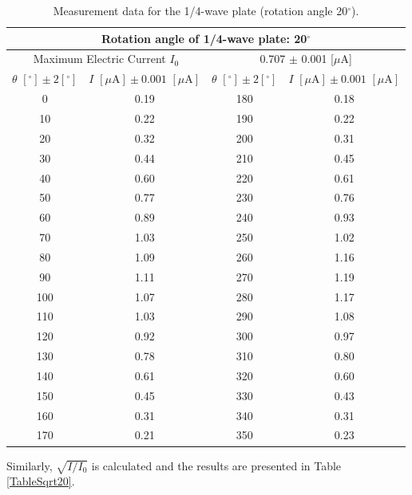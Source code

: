 \documentclass{article}
\begin{document}
\begin{table}[H]\centering
\begin{tabular}{cc||cc}
\multicolumn{4}{c}{Rotation angle of 1/4-wave plate: 20$^\circ$}\\
\toprule
\multicolumn{2}{c}{Maximum Electric Current $I_0$} & \multicolumn{2}{c}{0.707 $\pm$ 0.001 [$\mu$A]}\\
\midrule
$\theta\,\,[^\circ] \pm 2[^\circ]$ & $I\,\,[\mu\text{A}] \pm 0.001\,\,[\mu\text{A}]$ & $\theta\,\,[^\circ] \pm 2[^\circ]$ & $I\,\,[\mu\text{A}] \pm 0.001\,\,[\mu\text{A}]$\\
\midrule
0 & 0.19 & 180 & 0.18 \\
10 & 0.22 & 190 & 0.22 \\
20 & 0.32 & 200 & 0.31 \\
30 & 0.44 & 210 & 0.45 \\
40 & 0.60 & 220 & 0.61 \\
50 & 0.77 & 230 & 0.76 \\
60 & 0.89 & 240 & 0.93 \\
70 & 1.03 & 250 & 1.02 \\
80 & 1.09 & 260 & 1.16 \\
90 & 1.11 & 270 & 1.19 \\
100 & 1.07 & 280 & 1.17 \\
110 & 1.03 & 290 & 1.08 \\
120 & 0.92 & 300 & 0.97 \\
130 & 0.78 & 310 & 0.80 \\
140 & 0.61 & 320 & 0.60 \\
150 & 0.45 & 330 & 0.43 \\
160 & 0.31 & 340 & 0.31 \\
170 & 0.21 & 350 & 0.23 \\
\bottomrule
\end{tabular}
\caption{Measurement data for the 1/4-wave plate (rotation angle 20$^\circ$).}\label{Table1/420}
\end{table}

Similarly, $\sqrt{I/I_0}$ is calculated and the results are presented in Table \ref{TableSqrt20}.
\end{document}
